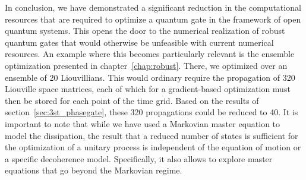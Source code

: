 In conclusion, we have demonstrated a significant reduction in the computational
resources that are required to optimize a quantum gate in the framework of open
quantum systems. This opens the door to the numerical realization of robust
quantum gates that would otherwise be unfeasible with current numerical
resources. An example where this becomes particularly relevant is the ensemble
optimization presented in chapter~\ref{chap:robust}. There, we optimized over an
ensemble of 20 Liouvillians. This would ordinary require the propagation of 320
Liouville space matrices, each of which for a gradient-based optimization must
then be stored for each point of the time grid. Based on the results of
section~\ref{sec:3st_phasegate}, these 320 propagations could be reduced to 40.
It is important to note that while we have used a Markovian
master equation to model the dissipation, the result that a reduced number of
states is sufficient for the optimization of a unitary process is independent of
the equation of motion or a specific decoherence model. Specifically, it also
allows to explore master equations that go beyond the Markovian regime.
